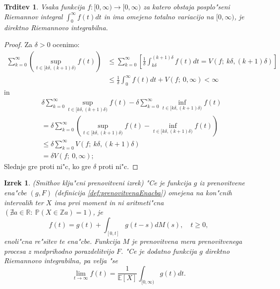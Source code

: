 \documentclass[12pt, a4paper, reqno]{amsart}
\theoremstyle{definition}
\theoremstyle{plain}
\newtheorem{izrek}[definicija]{Izrek}
\newtheorem{trditev}[definicija]{Trditev}
\newcommand{\R}{\mathbb{R}}
\newcommand{\E}{\mathbb{E}}
\newcommand{\Prob}{\mathbb{P}}
\newcommand{\1}{\mathds{1}}
\begin{document}
    \begin{trditev}
        Vsaka funkcija $f:[0, \infty) \to [0, \infty)$ za katero obstaja posplo"seni Riemannov integral
        $\int_0^\infty f(t)dt$ in ima omejeno totalno variacijo na $[0, \infty)$, je direktno Riemannovo integrabilna.
        \label{trd:kriterijZaDirektnoRiemannovoIntegrabilnost}
    \end{trditev}

    \begin{proof}
        Za $\delta > 0$ ocenimo: 
        \begin{align*}
            \sum_{k=0}^\infty\left(\sup_{t\in[k\delta, (k+1)\delta)}f(t)\right) 
            &\leq \sum_{k=0}^\infty \left[\frac{1}{\delta}\int_{k\delta}^{(k+1)\delta}f(t)dt = V(f;\>k\delta, (k+1)\delta)\right] \\
            &\leq \frac{1}{\delta}\int_0^\infty f(t)dt + V(f;\>0, \infty) < \infty
        \end{align*}
        in 
        \begin{align*}
            &\delta\sum_{k=0}^\infty\sup_{t\in[k\delta, (k+1)\delta)}f(t) - \delta\sum_{k=0}^\infty\inf_{t\in[k\delta, (k+1)\delta)}f(t) \\
            &= \delta\sum_{k=0}^\infty\left(\sup_{t\in[k\delta, (k+1)\delta)}f(t) - \inf_{t\in[k\delta, (k+1)\delta)}f(t)\right) \\
            &\leq \delta\sum_{k=0}^\infty V(f;\>k\delta, (k+1)\delta) \\
            &= \delta V(f;\>0, \infty);
        \end{align*}
        Slednje gre proti ni"c, ko gre $\delta$ proti ni"c.
    \end{proof}

    \begin{izrek}(Smithov klju"cni prenovitveni izrek)
        "Ce je funkcija $g$ iz prenovitvene ena"cbe $(g, F)$ (definicija \ref{def:prenovitvenaEnacba})
        omejena na kon"cnih intervalih ter $X$ ima prvi moment in ni aritmeti"cna 
        $(\nexists a\in\R: \ \Prob\left(X \in \mathbb{Z} a\right) = 1)$, je
        \begin{equation*}
            f(t) = g(t) +  \int_{[0, t]}g(t - s)dM(s), \quad t\geq 0,
        \end{equation*}
        enoli"cna re"sitev te ena"cbe. Funkcija $M$ je prenovitvena mera prenovitvenega procesa z medprihodno 
        porazdelitvijo $F$.
        "Ce je dodatno funkcija $g$ direktno Riemannovo integrabilna, pa velja "se
        \begin{equation*} 
            \lim_{t\to\infty}f(t) = \frac{1}{\E\left[X\right]}\int_{[0, \infty)}g(t)dt.
        \end{equation*}
        \label{izr:Smith}
    \end{izrek}
\end{document}

